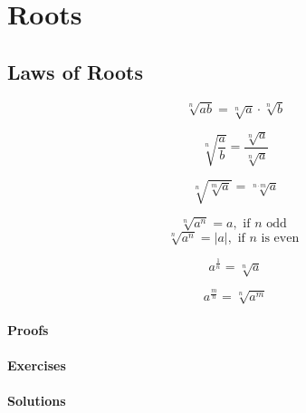 \section{Roots}

\subsection{Laws of Roots}

$$
\sqrt[n]{ab} = \sqrt[n]{a} \cdot \sqrt[n]{b} 
$$

$$
\sqrt[n]{ \frac{a}{b} } = \frac{ \sqrt[n]{a} }{ \sqrt[n]{a} }
$$

$$
\sqrt[n]{ \sqrt[m]{a}} = \sqrt[n \cdot m]{a} 
$$

$$
\sqrt[n]{ a^{n} } = a, \text{ if } n \text{ odd }
$$
$$ 
\sqrt[n]{ a^{n} } = \lvert a \rvert, \text{ if } n \text{ is even }
$$

$$
a^{ \frac{1}{n} } = \sqrt[n]{a}
$$

$$
a^{ \frac{m}{n} } = \sqrt[n]{ a^{m} }
$$

\paragraph*{Proofs}

\paragraph*{Exercises}

\paragraph*{Solutions}
